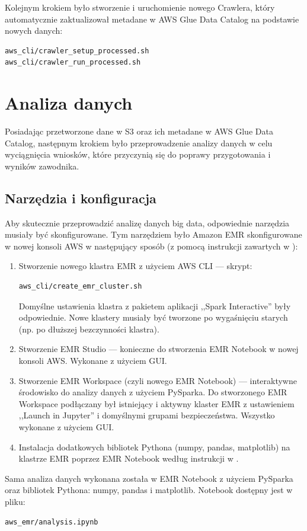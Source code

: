 \documentclass[12pt, a4paper]{article}
\begin{document}
Kolejnym krokiem było stworzenie i uruchomienie nowego Crawlera, który automatycznie zaktualizował metadane w AWS Glue Data Catalog na podstawie nowych danych:
\begin{verbatim}
aws_cli/crawler_setup_processed.sh
aws_cli/crawler_run_processed.sh
\end{verbatim}


\section{Analiza danych}
Posiadając przetworzone dane w S3 oraz ich metadane w AWS Glue Data Catalog, następnym krokiem było przeprowadzenie analizy danych w celu wyciągnięcia wniosków, które przyczynią się do poprawy przygotowania i wyników zawodnika. 

\subsection{Narzędzia i konfiguracja}
Aby skutecznie przeprowadzić analizę danych big data, odpowiednie narzędzia musiały być skonfigurowane. Tym narzędziem było Amazon EMR skonfigurowane w nowej konsoli AWS w następujący sposób (z pomocą instrukcji zawartych w \cite{aws_emr_setup}):
\begin{enumerate}
    \item Stworzenie nowego klastra EMR z użyciem AWS CLI --- skrypt:
\begin{verbatim}
aws_cli/create_emr_cluster.sh
\end{verbatim}
    Domyślne ustawienia klastra z pakietem aplikacji ,,Spark Interactive'' były odpowiednie. Nowe klastery musiały być tworzone po wygaśnięciu starych (np. po dłuższej bezczynności klastra). 
    \item Stworzenie EMR Studio --- konieczne do stworzenia EMR Notebook w nowej konsoli AWS. Wykonane z użyciem GUI.
    \item Stworzenie EMR Workspace (czyli nowego EMR Notebook) --- interaktywne środowisko do analizy danych z użyciem PySparka. Do stworzonego EMR Workspace podłączany był istniejący i aktywny klaster EMR z ustawieniem ,,Launch in Jupyter'' i domyślnymi grupami bezpieczeństwa. Wszystko wykonane z użyciem GUI.
    \item Instalacja dodatkowych bibliotek Pythona (numpy, pandas, matplotlib) na klastrze EMR poprzez EMR Notebook według instrukcji w \cite{emr_python_libs}.
\end{enumerate}

Sama analiza danych wykonana została w EMR Notebook z użyciem PySparka oraz bibliotek Pythona: numpy, pandas i matplotlib. Notebook dostępny jest w pliku:
\begin{verbatim}
aws_emr/analysis.ipynb
\end{verbatim}
\end{document}
